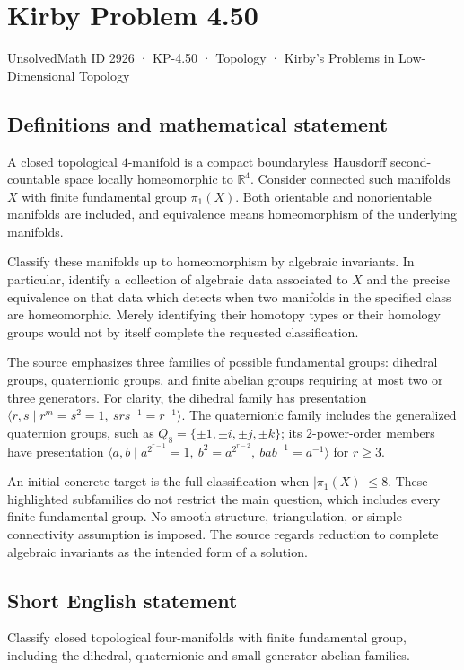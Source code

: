 \documentclass[11pt,a4paper]{article}
\begin{document}
\section*{Kirby Problem 4.50}\label{2926}
{\small UnsolvedMath ID 2926 · KP-4.50 · Topology · Kirby's Problems in Low-Dimensional Topology}
\subsection{Definitions and mathematical statement}
A closed topological $4$-manifold is a compact boundaryless Hausdorff
second-countable space locally homeomorphic to $\mathbb R^4$.
Consider connected such manifolds $X$ with finite fundamental group
$\pi_1(X)$. Both orientable and nonorientable manifolds are included,
and equivalence means homeomorphism of the underlying manifolds.

Classify these manifolds up to homeomorphism by algebraic invariants.
In particular, identify a collection of algebraic data associated to
$X$ and the precise equivalence on that data which detects when two
manifolds in the specified class are homeomorphic. Merely identifying
their homotopy types or their homology groups would not by itself
complete the requested classification.

The source emphasizes three families of possible fundamental groups:
dihedral groups, quaternionic groups, and finite abelian groups
requiring at most two or three generators. For clarity, the dihedral
family has presentation
$\langle r,s\mid r^m=s^2=1,\ srs^{-1}=r^{-1}\rangle$.
The quaternionic family includes the generalized quaternion groups,
such as $Q_8=\{\pm1,\pm i,\pm j,\pm k\}$; its $2$-power-order
members have presentation
$\langle a,b\mid a^{2^{r-1}}=1,\ b^2=a^{2^{r-2}},\ bab^{-1}=a^{-1}\rangle$
for $r\ge3$.

An initial concrete target is the full classification when
$|\pi_1(X)|\le8$. These highlighted subfamilies do not restrict the
main question, which includes every finite fundamental group.
No smooth structure, triangulation, or simple-connectivity assumption
is imposed. The source regards reduction to complete algebraic
invariants as the intended form of a solution.
\subsection{Short English statement}
Classify closed topological four-manifolds with finite fundamental group, including the dihedral, quaternionic and small-generator abelian families.
\end{document}
